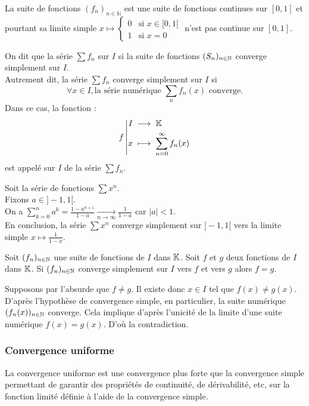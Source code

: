 \documentclass{book}
\newcommand{\fn}{(f_n)_{n\in \N   }}
\newcommand{\Sfn}{\sum f_n}
\begin{document}
\begin{Remarque}  La suite de fonctions $(f_n)_{n\in \mathbb{N}}$ est une suite de fonctions continues sur $[0,1]$ et pourtant sa limite simple $x \mapsto \begin{cases}0&{\text{si }}x\in[0,1[\\1&{\text{si } x=0}\end{cases}$ n'est pas continue sur $[0,1]$.
\end{Remarque}

\begin{Definition}[Convergence simple  $\Sfn$]
On dit que la série $\Sfn$  sur $I$
si la suite de fonctions $(S_n)_{n\in \mathbb{N}   }$ converge simplement sur $I$.\\
Autrement dit, la série $\Sfn$ converge simplement sur $I$ si
\[  \forall  x\in I, \text{la série numérique } \sum _n f_n(x) \text{ converge.}  \]
Dans ce cas, la fonction :
$$
{f}\left|\begin{aligned}{I}&\;\longrightarrow\;{\mathbb{K}  }\\{x}&\;\longmapsto\;{\sum_{n=0}^\infty f_n(x)}\end{aligned}\right.$$
 est appelé  sur $I$ de la série $\Sfn$.
\end{Definition}

\begin{Exemple} Soit la série de fonctions $\sum x^n$.\\
Fixons $a\in ]-1,1[$.\\
On a $\sum_{k=0}^n a^k= \frac{1-a^{n+1}}{1-a}\xrightarrow[{n\to \infty}]{}  \frac{1}{1-a}$ car $|a|<1$. \\
En conclusion,  la série  $\sum x^n$ converge simplement sur $]-1,1[$ vers la limite simple $x\mapsto \frac{1}{1-x}$.
\end{Exemple}

\begin{Proposition}
Soit $\fn$ une suite de fonctions de $I$ dans $\mathbb{K}  $.
Soit $f$ et $g$ deux fonctions de $I$ dans $\mathbb{K}  $.
Si $\fn$ converge simplement sur $I$ vers $f$ et vers $g$
alors $f = g$.
\end{Proposition}
\begin{Demonstration}
Supposons par l'absurde que $f\neq g$. Il existe donc $x\in I$ tel que  $f(x)\neq g(x).$ D'après l'hypothèse de convergence simple, en particulier, la suite numérique $(f_n(x))_{n\in\mathbb{N}}$ converge. Cela implique d'après l'unicité de la limite d'une suite numérique $f(x)=g(x)$. D'où la contradiction.  
\end{Demonstration}
%
%
\subsubsection{Convergence uniforme}
La convergence uniforme est une convergence plus forte que la convergence simple permettant de garantir des propriétés de continuité, de dérivabilité, etc,  sur la fonction limité définie à l'aide de la convergence simple. 
\end{document}
